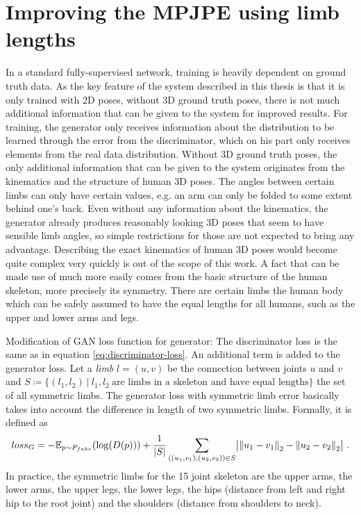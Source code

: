 \section{Improving the MPJPE using limb lengths}

In a standard fully-supervised network, training is heavily dependent on ground truth data.
As the key feature of the system described in this thesis is that it is only trained with 2D poses, without 3D ground truth poses, there is not much additional information that can be given to the system for improved results.
For training, the generator only receives information about the distribution to be learned through the error from the discriminator, which on his part only receives elements from the real data distribution.
Without 3D ground truth poses, the only additional information that can be given to the system originates from the kinematics and the structure of human 3D poses.
The angles between certain limbs can only have certain values, e.g. an arm can only be folded to some extent behind one's back. 
Even without any information about the kinematics, the generator already produces reasonably looking 3D poses that seem to have sensible limb angles, so simple restrictions for those are not expected to bring any advantage.
Describing the exact kinematics of human 3D poses would become quite complex very quickly is out of the scope of this work.
A fact that can be made use of much more easily comes from the basic structure of the human skeleton, more precisely its symmetry. 
There are certain limbs the human body which can be safely assumed to have the equal lengths for all humans, such as the upper and lower arms and legs.


Modification of GAN loss function for generator:
The discriminator loss is the same as in equation \ref{eq:discriminator-loss}. 
An additional term is added to the generator loss. Let a \textit{limb} $l = (u, v)$ be the connection between joints $u$ and $v$ and $S \coloneqq \{(l_1, l_2)~|~ l_1, l_2~\text{are limbs in a skeleton and have equal lengths}\}$ the set of all symmetric limbs. 
The generator loss with symmetric limb error basically takes into account the difference in length of two symmetric limbs.
Formally, it is defined as 
\begin{equation}
	loss_G = -\mathbb{E}_{p\sim P_{fake}}(\log(D(p))) 
	+ \frac{1}{|S|}\sum_{((u_1, v_1), (u_2, v_2)) \in S} \bigl\lvert \norm{u_1 - v_1}_2 - \norm{u_2 - v_2}_2 \bigr\rvert \ .
\end{equation}
In practice, the symmetric limbs for the 15 joint skeleton are the upper arms, the lower arms, the upper legs, the lower legs, the hips (distance from left and right hip to the root joint) and the shoulders (distance from shoulders to neck).